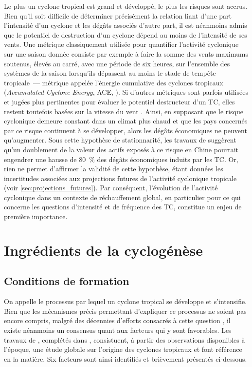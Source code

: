\documentclass[../main.tex]{subfiles}
\begin{document}
Le plus un cyclone tropical est grand et développé, le plus les risques sont accrus. Bien qu'il soit difficile de déterminer précisément la relation liant d'une part l'intensité d'un cyclone et les dégâts associés d'autre part, il est néanmoins admis que le potentiel de destruction d'un cyclone dépend au moins de l'intensité de ses vents. Une métrique classiquement utilisée pour quantifier l'activité cyclonique sur une saison donnée consiste par exemple à faire la somme des vents
maximums soutenus, élevés au carré, avec une période de six heures, sur l'ensemble des systèmes de la saison lorsqu'ils dépassent au moins le stade de tempête tropicale~--- métrique appelée l'énergie cumulative des cyclones tropicaux (\textit{Accumulated Cyclone Energy}, ACE, \cite{bell_climate_2000}). Si d'autres métriques sont parfois utilisées et jugées plus pertinentes pour évaluer le potentiel destructeur d'un TC, elles restent toutefois basées sur la vitesse du vent
\parencite{powell_tropical_2007}. Ainsi, en supposant que le risque cyclonique demeure constant dans un climat plus chaud et que les pays concernés par ce risque continuent à se développer, alors les dégâts économiques ne peuvent
qu'augmenter. Sous cette hypothèse de stationnarité, les travaux de \cite{ye_dependence_2020} suggèrent qu'un doublement de la valeur des actifs exposés à ce risque en Chine pourrait engendrer une hausse de \SI{80}{\percent} des dégâts économiques induits par les TC. Or, rien ne permet d'affirmer la validité de cette hypothèse, étant données les incertitudes associées aux projections futures de l'activité cyclonique tropicale (voir \cref{sec:projections_futures}). Par conséquent,
l'évolution de l'activité cyclonique dans un contexte de réchauffement global, en particulier pour ce qui concerne les questions d'intensité et de fréquence des TC, constitue un enjeu de première importance.

\section{Ingrédients de la cyclogénèse}
  
\subsection{Conditions de formation}\label{sec:conditions_cyclogenese}

On appelle  le processus par lequel un cyclone tropical se développe et s'intensifie. Bien que les mécanismes précis permettant d'expliquer ce processus ne soient pas encore compris, malgré des décennies d'efforts consacrés à cette question \parencite{yanai_formation_1964, montgomery_tropical_1993, gray_formation_1998, tory_tropical_2010}, il existe néanmoins un consensus quant aux facteurs qui y sont favorables. Les travaux de \cite{gray_global_1968}, complétés dans
\cite{gray_tropical_1975}, consistuent, à partir des observations disponibles à l'époque, une étude globale sur l'origine des cyclones tropicaux et font référence en la matière. Six facteurs sont ainsi identifiés et brièvement présentés ci-dessous.
\end{document}
